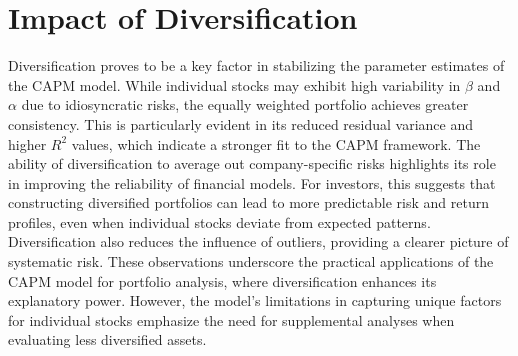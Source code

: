 \section{Impact of Diversification}
Diversification proves to be a key factor in stabilizing the parameter estimates of the CAPM model. 
While individual stocks may exhibit high variability in $\beta$ and $\alpha$ due to idiosyncratic risks, the equally weighted
portfolio achieves greater consistency. 
This is particularly evident in its reduced residual variance and higher $R^2$ values, which indicate a stronger fit to the 
CAPM framework.
The ability of diversification to average out company-specific risks highlights its role in improving the reliability of 
financial models. 
For investors, this suggests that constructing diversified portfolios can lead to more predictable risk and return profiles,
even when individual stocks deviate from expected patterns. 
Diversification also reduces the influence of outliers, providing a clearer picture of systematic risk.
These observations underscore the practical applications of the CAPM model for portfolio analysis, where diversification
enhances its explanatory power. 
However, the model's limitations in capturing unique factors for individual stocks emphasize the need for supplemental
analyses when evaluating less diversified assets.
